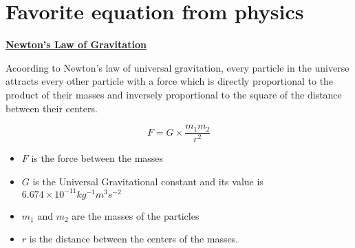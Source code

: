 \documentclass[]{article}
\begin{document}
\section{Favorite equation from physics}
\begin{center}
\Large{\textbf{\underline{Newton's Law of Gravitation}}}
\end{center}
\begin{justify}
Acoording to Newton's law of universal gravitation, every particle in the universe attracts every other particle with a force which is directly proportional to the product of their masses and inversely proportional to the square of the distance between their centers.
\end{justify}
\begin{equation}
  F = G \times \frac{m_1 m_2}{r^2}  
  \end{equation}
\begin{itemize}
  \item $F$ is the force between the masses
  \item $G$ is the Universal Gravitational constant and its value is $6.674 \times 10 ^{-11}  kg^{-1}m^{3}s^{-2}$
  \item $m_1$ and $m_2$ are the masses of the particles
  \item $r$ is the distance between the centers of the masses.
\end{itemize}
\end{document}
